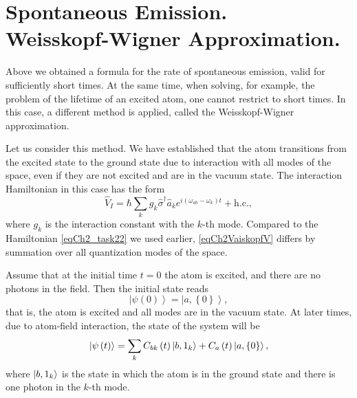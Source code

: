 \section{Spontaneous Emission. \\
  Weisskopf-Wigner Approximation.}
Above we obtained a formula for the rate of spontaneous emission,
valid for sufficiently short times. At the same time, when solving,
for example, the problem of the lifetime of an excited atom, one cannot
restrict to short times. In this case, a different method is applied,
called the Weisskopf-Wigner approximation.

Let us consider this method. We have established that the atom transitions from the excited
state to the ground state due to interaction with all modes
of the space, even if they are not excited and are in the vacuum
state. The interaction Hamiltonian in this case has the form
\begin{equation}
\hat{V}_I = \hbar \sum_{k} g_k \hat{\sigma}^{\dag}\hat{a}_k e^{i\left(
\omega_{ab} - \omega_k
\right)t} + \mbox{h.c.},
\label{eqCh2VaiskopfV}
\end{equation}
where $g_k$ is the interaction constant with the $k$-th mode. Compared to the Hamiltonian \eqref{eqCh2_task22}
we used earlier,
\eqref{eqCh2VaiskopfV} differs by summation over all quantization modes
of the space.

Assume that at the initial time $t=0$ the atom is excited, and
there are no photons in the field. Then the initial state reads
\begin{equation}
\left|\psi\left(0\right)\right> =
 \left|a, \left\{0\right\}\right>,
\nonumber
\end{equation}
that is, the atom is excited and all modes are in the vacuum state. At
later times, due to atom-field interaction, the state of the system
will be
\begin{equation}
\left|\psi\left(t\right)\right> =
\sum_{k} C_{bk}\left(t\right) \ket{b, 1_k}
+
C_{a}\left(t\right) \left|a, \left\{0\right\}\right>,
\label{eqCh2Vaiskopf3}
\end{equation}
where $\ket{b, 1_k}$ is the state in which the atom is in the ground
state and there is one photon in the $k$-th mode. 

